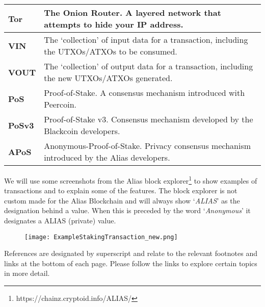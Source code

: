 \begin{table}[h]
{\begin{tabular}{@{}ll@{}}
\textbf{Tor} & The Onion Router. A layered network that attempts to hide 
your IP address. \\ 
\midrule
\textbf{VIN} & The ‘collection’ of input data for a transaction, including 
the UTXOs/ATXOs to be consumed. \\ 
\midrule
\textbf{VOUT} & The ‘collection’ of output data for a transaction, including 
the new UTXOs/ATXOs generated. \\ 
\midrule
\textbf{PoS} & Proof-of-Stake. A consensus mechanism introduced with Peercoin. \\ 
\midrule
\textbf{PoSv3} & Proof-of-Stake v3. Consensus mechanism developed by the 
Blackcoin developers. \\ 
\midrule
\textbf{APoS} & Anonymous-Proof-of-Stake. Privacy consensus mechanism 
introduced by the Alias developers. \\ 
\hline
\end{tabular}%
}
\end{table}
\noindent
We will use some screenshots from the Alias block
explorer\footnote{https://chainz.cryptoid.info/ALIAS/} to show examples of
transactions and to explain some of the features. The block explorer
is not custom made for the Alias Blockchain and will always show ‘\textit{ALIAS}’
as the designation behind a value. When this is preceded by the word
‘\textit{Anonymous}’ it designates a ALIAS (private) value.
\begin{figure}[ht]
	\centering
	\texttt{[image: ExampleStakingTransaction\_new.png]}
\end{figure}
\noindent
References are designated by superscript and relate to the relevant
footnotes and links at the bottom of each page. Please follow the links to
explore certain topics in more detail.